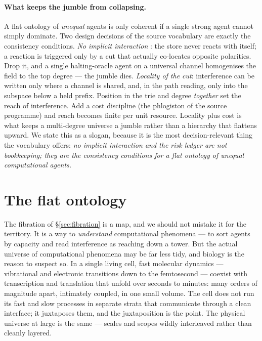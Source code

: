 \paragraph{What keeps the jumble from collapsing.}
A flat ontology of \emph{unequal} agents is only coherent if a single strong agent
cannot simply dominate. Two design decisions of the source vocabulary are exactly
the consistency conditions. \emph{No implicit interaction} \cite{paths}: the store
never reacts with itself; a reaction is triggered only by a cut that actually
co-locates opposite polarities. Drop it, and a single halting-oracle agent on a
universal channel homogenises the field to the top degree --- the jumble dies.
\emph{Locality of the cut}: interference can be written only where a channel is
shared, and, in the path reading, only into the subspace below a held prefix.
Position in the trie and degree \emph{together} set the reach of interference. Add
a cost discipline (the phlogiston of the source programme) and reach becomes finite
per unit resource. Locality plus cost is what keeps a multi-degree universe a
jumble rather than a hierarchy that flattens upward. We state this as a slogan,
because it is the most decision-relevant thing the vocabulary offers: \emph{no
implicit interaction and the risk ledger are not bookkeeping; they are the
consistency conditions for a flat ontology of unequal computational agents.}


\section{The flat ontology}\label{ndo:sec:flat}

The fibration of \S\ref{sec:fibration} is a map, and we should not mistake it for the
territory. It is a way to \emph{understand} computational phenomena --- to sort agents
by capacity and read interference as reaching down a tower. But the actual universe of
computational phenomena may be far less tidy, and biology is the reason to suspect so.
In a single living cell, fast molecular dynamics --- vibrational and electronic
transitions down to the femtosecond --- coexist with transcription and translation
that unfold over seconds to minutes: many orders of magnitude apart, intimately
coupled, in one small volume. The cell does not run its fast and slow processes in
separate strata that communicate through a clean interface; it juxtaposes them, and the
juxtaposition is the point. The physical universe at large is the same --- scales and
scopes wildly interleaved rather than cleanly layered.

